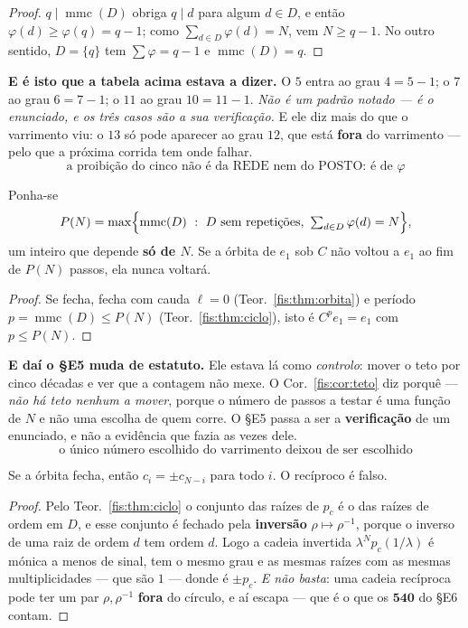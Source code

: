 \documentclass[livro.tex]{subfiles}
\begin{document}
\begin{proof}
$q\mid\operatorname{mmc}(D)$ obriga $q\mid d$ para algum $d\in D$, e então
$\varphi(d)\ge\varphi(q)=q-1$; como $\sum_{d\in D}\varphi(d)=N$, vem $N\ge q-1$.
No outro sentido, $D=\{q\}$ tem $\sum\varphi=q-1$ e $\operatorname{mmc}(D)=q$.
\end{proof}

\medskip\noindent\textbf{E é isto que a tabela acima estava a dizer.} O $5$
entra ao grau $4=5-1$; o $7$ ao grau $6=7-1$; o $11$ ao grau $10=11-1$.
\emph{Não é um padrão notado --- é o enunciado, e os três casos são a sua
verificação.} E ele diz mais do que o varrimento viu: o $13$ só pode aparecer ao
grau $12$, que está \textbf{fora} do varrimento --- pelo que a próxima corrida
tem onde falhar.
\[
\boxed{\;\text{a proibição do cinco não é da REDE nem do POSTO: é de }\varphi\;}
\]

\begin{corolario}\label{fis:cor:teto}
Ponha-se
\[
P(N)=\max\Bigl\{\operatorname{mmc}(D)\ :\ D\ \text{sem repetições},\
\textstyle\sum_{d\in D}\varphi(d)=N\Bigr\},
\]
um inteiro que depende \textbf{só de $N$}. Se a órbita de $e_1$ sob $C$ não
voltou a $e_1$ ao fim de $P(N)$ passos, ela nunca voltará.
\end{corolario}

\begin{proof}
Se fecha, fecha com cauda $\ell=0$ (Teor.~\ref{fis:thm:orbita}) e período
$p=\operatorname{mmc}(D)\le P(N)$ (Teor.~\ref{fis:thm:ciclo}), isto é
$C^{p}e_1=e_1$ com $p\le P(N)$.
\end{proof}

\medskip\noindent\textbf{E daí o §E5 muda de estatuto.} Ele estava lá como
\emph{controlo}: mover o teto por cinco décadas e ver que a contagem não mexe. O
Cor.~\ref{fis:cor:teto} diz porquê --- \emph{não há teto nenhum a mover}, porque
o número de passos a testar é uma função de $N$ e não uma escolha de quem corre.
O §E5 passa a ser a \textbf{verificação} de um enunciado, e não a evidência que
fazia as vezes dele.
\[
\boxed{\;\text{o único número escolhido do varrimento deixou de ser escolhido}\;}
\]

\begin{corolario}\label{fis:cor:recip}
Se a órbita fecha, então $c_i=\pm c_{N-i}$ para todo $i$. O recíproco é falso.
\end{corolario}

\begin{proof}
Pelo Teor.~\ref{fis:thm:ciclo} o conjunto das raízes de $p_c$ é o das raízes de
ordem em $D$, e esse conjunto é fechado pela \textbf{inversão}
$\rho\mapsto\rho^{-1}$, porque o inverso de uma raiz de ordem $d$ tem ordem $d$.
Logo a cadeia invertida $\lambda^{N}p_c(1/\lambda)$ é mónica a menos de sinal,
tem o mesmo grau e as mesmas raízes com as mesmas multiplicidades --- que são $1$
--- donde é $\pm p_c$. \emph{E não basta}: uma cadeia recíproca pode ter um par
$\rho,\rho^{-1}$ \textbf{fora} do círculo, e aí escapa --- que é o que os
$\mathbf{540}$ do §E6 contam.
\end{proof}
\end{document}
